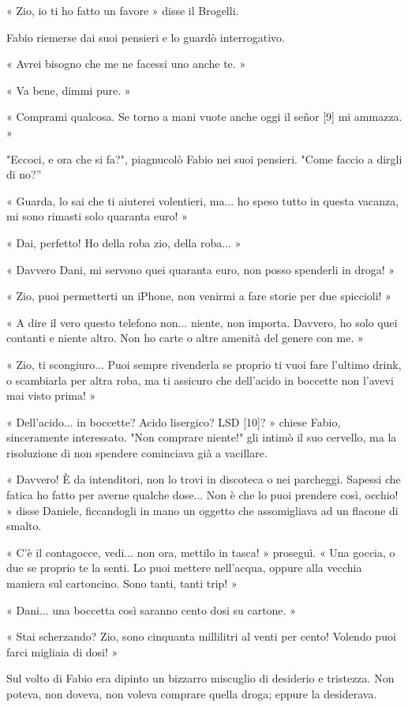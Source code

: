 « Zio, io ti ho fatto un favore » disse il Brogelli.

Fabio riemerse dai suoi pensieri e lo guardò interrogativo.

« Avrei bisogno che me ne facessi uno anche te. »

« Va bene, dimmi pure. »

« Comprami qualcosa. Se torno a mani vuote anche oggi il señor [9] mi ammazza. »

"Eccoci, e ora che si fa?", piagnucolò Fabio nei suoi pensieri. "Come faccio a dirgli di no?''

« Guarda, lo sai che ti aiuterei volentieri, ma... ho speso tutto in questa vacanza, mi sono rimasti solo quaranta euro! »

« Dai, perfetto! Ho della roba zio, della roba... »

« Davvero Dani, mi servono quei quaranta euro, non posso spenderli in droga! »

« Zio, puoi permetterti un iPhone, non venirmi a fare storie per due spiccioli! »

« A dire il vero questo telefono non... niente, non importa. Davvero, ho solo quei contanti e niente altro. Non ho carte o altre amenità del genere con me. »

« Zio, ti scongiuro... Puoi sempre rivenderla se proprio ti vuoi fare l'ultimo drink, o scambiarla per altra roba, ma ti assicuro che dell'acido in boccette non l'avevi mai visto prima! »

« Dell'acido... in boccette? Acido lisergico? LSD [10]? » chiese Fabio, sinceramente interessato. "Non comprare niente!" gli intimò il suo cervello, ma la risoluzione di non spendere cominciava già a vacillare.

« Davvero! È da intenditori, non lo trovi in discoteca o nei parcheggi. Sapessi che fatica ho fatto per averne qualche dose... Non è che lo puoi prendere così, occhio! » disse Daniele, ficcandogli in mano un oggetto che assomigliava ad un flacone di smalto.

« C'è il contagocce, vedi... non ora, mettilo in tasca! » proseguì. « Una goccia, o due se proprio te la senti. Lo puoi mettere nell'acqua, oppure alla vecchia maniera sul cartoncino. Sono tanti, tanti trip! »

« Dani... una boccetta così saranno cento dosi su cartone. »

« Stai scherzando? Zio, sono cinquanta millilitri al venti per cento! Volendo puoi farci migliaia di dosi! »

Sul volto di Fabio era dipinto un bizzarro miscuglio di desiderio e tristezza. Non poteva, non doveva, non voleva comprare quella droga; eppure la desiderava.

